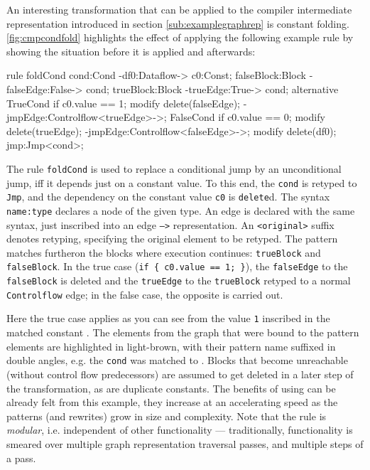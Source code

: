 An interesting transformation that can be applied to the compiler intermediate representation introduced in section \ref{sub:examplegraphrep} is constant folding.
\autoref{fig:cmpcondfold} highlights the effect of applying the following example rule by showing the situation before it is applied and afterwards:

\begin{grgen}
rule foldCond {
	cond:Cond -df0:Dataflow-> c0:Const;
	falseBlock:Block -falseEdge:False-> cond;
	trueBlock:Block -trueEdge:True-> cond;
	alternative {
		TrueCond {
			if { c0.value == 1; }
			modify {
				delete(falseEdge);
				-jmpEdge:Controlflow<trueEdge>->;
			}
		}
		FalseCond {
			if { c0.value == 0; }
			modify {
				delete(trueEdge);
				-jmpEdge:Controlflow<falseEdge>->;
			}
		}
	}
	modify {
		delete(df0);
		jmp:Jmp<cond>;
	}
}
\end{grgen}

The rule \texttt{foldCond} is used to replace a conditional jump by an unconditional jump, iff it depends just on a constant value.
To this end, the \texttt{cond} is retyped to \texttt{Jmp},
and the dependency on the constant value \texttt{c0} is \texttt{delete}d.
The syntax \texttt{name:type} declares a node of the given type.
An edge is declared with the same syntax, just inscribed into an edge \texttt{-->} representation.
An \texttt{<original>} suffix denotes retyping, specifying the original element to be retyped.
The pattern matches furtheron the blocks where execution continues: \texttt{trueBlock} and \texttt{falseBlock}.
In the true case (\texttt{if \{ c0.value == 1; \}}), the \texttt{falseEdge} to the \texttt{falseBlock} is deleted and the \texttt{trueEdge} to the \texttt{trueBlock} retyped to a normal \texttt{Controlflow} edge; in the false case, the opposite is carried out.

Here the true case applies as you can see from the value \texttt{1} inscribed in the matched constant .
The elements from the graph that were bound to the pattern elements are highlighted in light-brown, with their pattern name suffixed in double angles, e.g. the \texttt{cond} was matched to  .
Blocks that become unreachable (without control flow predecessors) are assumed to get deleted in a later step of the transformation,
as are duplicate constants.
The benefits of using \GrG{ }can be already felt from this example, they increase at an accelerating speed as the patterns (and rewrites) grow in size and complexity.
Note that the rule is \emph{modular}, i.e. independent of other functionality --- traditionally, functionality is smeared over multiple graph representation traversal passes, and multiple steps of a pass.

